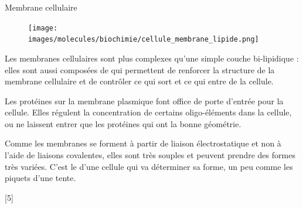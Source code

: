 \begin{doc}{Membrane cellulaire}
  \begin{figure}
    \centering
    \vspace*{-36pt}
    \texttt{[image: images/molecules/biochimie/cellule\_membrane\_lipide.png]}
  \end{figure}
  Les membranes cellulaires sont plus complexes qu'une simple couche bi-lipidique : elles sont aussi composées de  qui permettent de renforcer la structure de la membrane cellulaire et de contrôler ce qui sort et ce qui entre de la cellule.
  \smallskip

  Les protéines sur la membrane plasmique font office de porte d'entrée pour la cellule. 
  Elles régulent la concentration de certains oligo-éléments dans la cellule, ou ne laissent entrer que les protéines qui ont la bonne géométrie.

  Comme les membranes se forment à partir de liaison électrostatique et non à l'aide de liaisons covalentes, elles sont très souples et peuvent prendre des formes très variées. 
  C'est le  d'une cellule qui va déterminer sa forme, un peu comme les piquets d'une tente.
  
  \phantom{b}
\end{doc}

[5]
